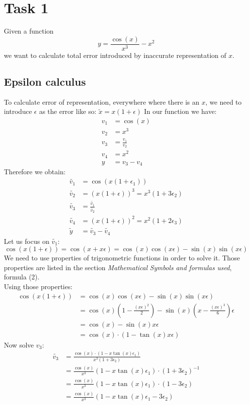\section{Task 1}
Given a function $$y = \frac{\cos(x)}{x^3} - x^2$$ we want to calculate total
error introduced by inaccurate representation of $x$.
\subsection{Epsilon calculus}
To calculate error of representation, everywhere where there is an $x$, we need
to introduce $\epsilon$ as the error like so: $\tilde{x} = x(1+\epsilon)$
In our function we have:
\begin{align*}
    v_1 &= \cos(x) \\ 
    v_2 &= x^3 \\ 
    v_3 &= \frac{v_1}{v_2} \\ 
    v_4 &= x^2 \\ 
    y &= v_3 - v_4
\end{align*}
Therefore we obtain:
\begin{align*}
    \tilde{v_1} &= \cos(x(1+\epsilon_1)) \\ 
    \tilde{v_2} &= (x(1+\epsilon))^3 = x^3 (1+3\epsilon_2) \\ 
    \tilde{v_3} &= \frac{\tilde{v_1}}{\tilde{v_2}} \\ 
    \tilde{v_4} &= (x(1+\epsilon))^2 = x^2 (1+2\epsilon_3) \\
    \tilde{y} &= \tilde{v_3} - \tilde{v_4}
\end{align*}
Let us focus on $\tilde{ v_1 }$:
$$ \cos(x(1+\epsilon)) = \cos(x+x\epsilon) = \cos(x)\cos(x\epsilon) -
\sin(x)\sin(x\epsilon) $$
We need to use properties of trigonometric functions in order to solve it.
Those properties are listed in the section \textit{Mathematical Symbols and
formulas used}, formula (2). \\
Using those properties:
\begin{align*}
    \cos(x(1+\epsilon)) &= \cos(x)\cos(x\epsilon) - \sin(x)\sin(x\epsilon)\\
    &= \cos(x)(1-\frac{(x\epsilon)^2}{2}) - \sin(x)(x-\frac{(x\epsilon)^3}{6})\epsilon \\
    &= \cos(x) - \sin(x)x\epsilon\\
    &= \cos(x)\cdot (1-\tan(x)x\epsilon)
\end{align*}
Now solve $v_3$:
\begin{align*}
    \tilde{v_3} &= \displaystyle\frac{\cos(x) \cdot (1 - x\tan(x)
    \epsilon_1)}{x^3 (1+3\epsilon_2)}\\
    &= \frac{\cos(x)}{x^3} (1 - x\tan(x) \epsilon_1)\cdot (1+3\epsilon_2)^{-1}\\
    &= \frac{\cos(x)}{x^3} (1 - x\tan(x) \epsilon_1)\cdot (1-3\epsilon_2)\\
    &= \frac{\cos(x)}{x^3} (1 - x\tan(x) \epsilon_1 - 3\epsilon_2)
\end{align*}
